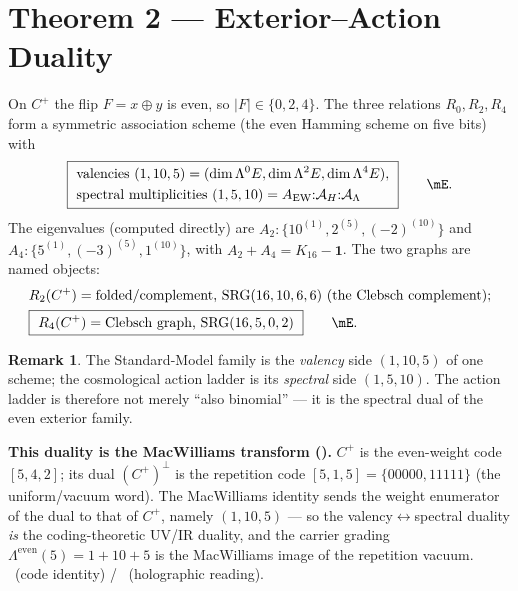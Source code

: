 \documentclass[11pt,a4paper]{article}
\newcommand{\AEW}{A_{\mathrm{EW}}}
\newcommand{\AL}{\mathcal A_\Lambda}
\newcommand{\AH}{\mathcal A_H}
\theoremstyle{definition}
\newtheorem*{remark}{Remark}
\begin{document}
\section*{Theorem 2 --- Exterior--Action Duality}
On $C^+$ the flip $F=x\oplus y$ is even, so $|F|\in\{0,2,4\}$. The three relations
$R_0,R_2,R_4$ form a symmetric association scheme (the even Hamming scheme on five bits) with
\begin{equation}
  \boxed{\ \begin{aligned}
    &\text{valencies}\ (1,10,5)=(\dim\Lambda^0E,\dim\Lambda^2E,\dim\Lambda^4E),\\
    &\text{spectral multiplicities}\ (1,5,10)=\AEW{:}\AH{:}\AL
  \end{aligned}\ }\qquad\mE .
\end{equation}
The eigenvalues (computed directly) are
$A_2:\{10^{(1)},2^{(5)},(-2)^{(10)}\}$ and $A_4:\{5^{(1)},(-3)^{(5)},1^{(10)}\}$, with
$A_2+A_4=K_{16}-\mathbf 1$. The two graphs are named objects:
\begin{equation}
\begin{aligned}
  &R_2(C^+)=\text{folded/complement, } \mathrm{SRG}(16,10,6,6)\ (\text{the Clebsch complement});\\
  &\boxed{\ R_4(C^+)=\text{Clebsch graph, } \mathrm{SRG}(16,5,0,2)\ }\qquad\mE .
\end{aligned}
\end{equation}
\begin{remark}
The Standard-Model family is the \emph{valency} side $(1,10,5)$ of one scheme; the cosmological action
ladder is its \emph{spectral} side $(1,5,10)$. The action ladder is therefore not merely ``also
binomial'' --- it is the spectral dual of the even exterior family. \mC
\end{remark}
\noindent\textbf{This duality is the MacWilliams transform ().} $C^+$ is the
even-weight code $[5,4,2]$; its dual $(C^+)^\perp$ is the repetition code $[5,1,5]=\{00000,11111\}$ (the
uniform/vacuum word). The MacWilliams identity sends the weight enumerator of the dual to that of $C^+$, namely
$(1,10,5)$ --- so the valency$\leftrightarrow$spectral duality \emph{is} the coding-theoretic UV/IR duality, and
the carrier grading $\Lambda^{\mathrm{even}}(5)=1{+}10{+}5$ is the MacWilliams image of the repetition vacuum.
\mE\ (code identity) / \mC\ (holographic reading).
\end{document}
